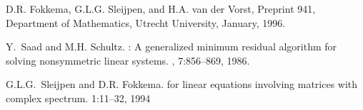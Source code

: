 \documentclass[12pt,a4paper]{article}
\begin{document}
\begin{thebibliography}{9}

D.R. Fokkema, G.L.G. Sleijpen, and H.A. van der Vorst, 
\newblock Preprint 941, Department of Mathematics, Utrecht University, January, 1996.

Y.~Saad and M.H. Schultz.
: A generalized minimum residual algorithm for solving nonsymmetric linear systems.
, 7:856--869, 1986.

G.L.G.~Sleijpen and D.R. Fokkema.
 for linear equations involving matrices with complex spectrum.
 1:11--32, 1994

\end{thebibliography}
\end{document}
